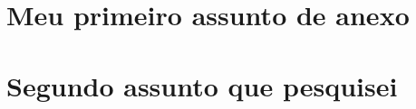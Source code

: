 \begin{anexosenv}
    
        \chapter{Meu primeiro assunto de anexo}
        \lipsum[30]
    
    
        \chapter{Segundo assunto que pesquisei}
        \lipsum[31]
    
    \end{anexosenv}
